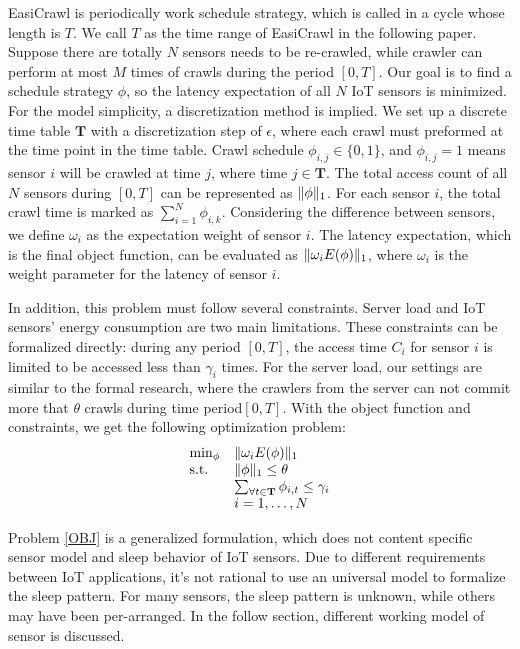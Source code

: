 \documentclass[conference]{IEEEtran}
\begin{document}
EasiCrawl is periodically work schedule strategy, which is called in a cycle whose length is $T$. We call $T$ as the time range of EasiCrawl in the following paper.
Suppose there are totally $N$ sensors needs to be re-crawled, while crawler can perform at most $M$ times of crawls during the period $[0, T]$. Our goal is to find a schedule strategy $\phi$, so the latency expectation of all $N$ IoT sensors is minimized. 
For the model simplicity, a discretization method is implied. We set up a discrete time table $\mathbf{T}$ with a discretization step of $\epsilon$, where each crawl must preformed at the time point in the time table.
Crawl schedule $\phi_{i,j}\in\{0,1\}$, and $\phi_{i,j}=1$ means sensor $i$ will be crawled at time $j$, where time $j\in\mathbf{T}$.
The total access count of all $N$ sensors during $[0, T]$ can be represented as $\Arrowvert\phi\Arrowvert_{1}$. For each sensor $i$, the total crawl time is marked as $\sum_{i=1}^{N}\phi_{i,k}$. 
Considering the difference between sensors, we define $\omega_i$ as the expectation weight of sensor $i$. The latency expectation, which is the final object function, can be evaluated as $\Arrowvert \omega_i E(\phi) \Arrowvert_{1}$, where $\omega_i$ is the weight parameter for the latency of sensor $i$.

In addition, this problem must follow several constraints. Server load and IoT sensors' energy consumption are two main limitations. 
These constraints can be formalized directly: during any period $[0, T]$, the access time $C_i$ for sensor $i$ is limited to be accessed less than $\gamma_i$ times. For the server load, our settings are similar to the formal research\cite{Wolf2002}, where the crawlers from the server can not commit more that $\theta$ crawls during time period$[0, T]$.
With the object function and constraints, we get the following optimization problem:
\begin{eqnarray}
\begin{array}{ll}
\min_{\phi}&\Arrowvert \omega_i E(\phi) \Arrowvert_{1}\\
\text{s.t.}
&\Arrowvert \phi \Arrowvert_{1}\leq\theta\\
&\sum_{\forall t \in \mathbf{T}}{\phi_{i,t}}\leq\gamma_i\\
&i=1,\ldots,N
\end{array}\label{OBJ}
\end{eqnarray}

Problem \eqref{OBJ} is a generalized formulation, which does not content specific sensor model and sleep behavior of IoT sensors. Due to different requirements between IoT applications, it's not rational to use an universal model to formalize the sleep pattern. For many sensors, the sleep pattern is unknown, while others may have been per-arranged.  In the follow section, different working model of sensor is discussed. 
\end{document}
